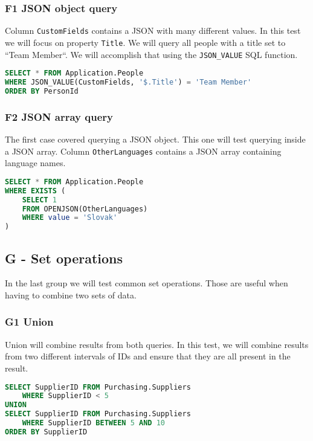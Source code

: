 \subsubsection*{F1 JSON object query}

Column \texttt{CustomFields} contains a JSON with many different values. In this test we will focus on property \texttt{Title}. We will query all people with a title set to ``Team Member``.
We will accomplish that using the \texttt{JSON\_VALUE} SQL function.

\begin{lstlisting}[language=SQL]
SELECT * FROM Application.People
WHERE JSON_VALUE(CustomFields, '$.Title') = 'Team Member'
ORDER BY PersonId
\end{lstlisting}

\subsubsection*{F2 JSON array query}

The first case covered querying a JSON object. This one will test querying inside a JSON array. Column \texttt{OtherLanguages} contains a JSON array containing language names.

\begin{lstlisting}[language=SQL]
SELECT * FROM Application.People
WHERE EXISTS (
    SELECT 1
    FROM OPENJSON(OtherLanguages)
    WHERE value = 'Slovak'
)
\end{lstlisting}

\subsection{G - Set operations}

In the last group we will test common set operations. Those are useful when having to combine two sets of data.

\subsubsection*{G1 Union}

Union will combine results from both queries. In this test, we will combine results from two different intervals of IDs and ensure that they are all present in the result.

\begin{lstlisting}[language=SQL]
SELECT SupplierID FROM Purchasing.Suppliers 
    WHERE SupplierID < 5
UNION
SELECT SupplierID FROM Purchasing.Suppliers 
    WHERE SupplierID BETWEEN 5 AND 10
ORDER BY SupplierID
\end{lstlisting}

